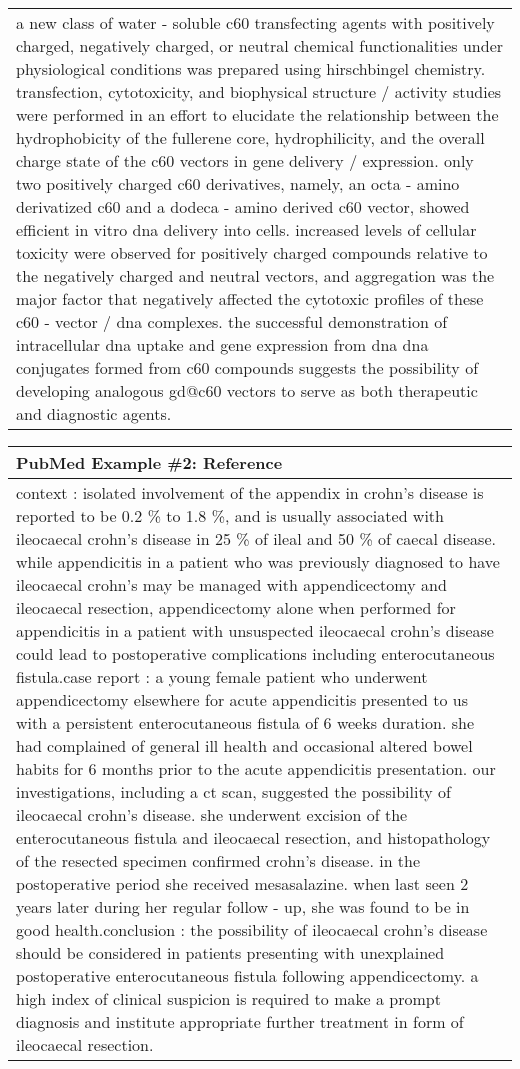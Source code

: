 \documentclass{article} \usepackage{iclr2022_conference,times}
\begin{document}
\begin{table}[!htbp]
\begin{tabular}{p{\linewidth}}
a new class of water - soluble c60 transfecting agents with positively charged, negatively charged, or neutral chemical functionalities under physiological conditions was prepared using hirschbingel chemistry. transfection, cytotoxicity, and biophysical structure / activity studies were performed in an effort to elucidate the relationship between the hydrophobicity of the fullerene core, hydrophilicity, and the overall charge state of the c60 vectors in gene delivery / expression. only two positively charged c60 derivatives, namely, an octa - amino derivatized c60 and a dodeca - amino derived c60 vector, showed efficient in vitro dna delivery into cells. increased levels of cellular toxicity were observed for positively charged compounds relative to the negatively charged and neutral vectors, and aggregation was the major factor that negatively affected the cytotoxic profiles of these c60 - vector / dna complexes. the successful demonstration of intracellular dna uptake and gene expression from dna dna conjugates formed from c60 compounds suggests the possibility of developing analogous gd@c60 vectors to serve as both therapeutic and diagnostic agents.
    \\
    \end{tabular}
    \begin{tabular}{p{\linewidth}} 
    \midrule
    \textbf{PubMed Example \#2: Reference} \\
    \midrule
context : isolated involvement of the appendix in crohn's disease is reported to be 0.2 \% to 1.8 \%, and is usually associated with ileocaecal crohn's disease in 25 \% of ileal and 50 \% of caecal disease. while appendicitis in a patient who was previously diagnosed to have ileocaecal crohn's may be managed with appendicectomy and ileocaecal resection, appendicectomy alone when performed for appendicitis in a patient with unsuspected ileocaecal crohn's disease could lead to postoperative complications including enterocutaneous fistula.case report : a young female patient who underwent appendicectomy elsewhere for acute appendicitis presented to us with a persistent enterocutaneous fistula of 6 weeks duration. she had complained of general ill health and occasional altered bowel habits for 6 months prior to the acute appendicitis presentation. our investigations, including a ct scan, suggested the possibility of ileocaecal crohn's disease. she underwent excision of the enterocutaneous fistula and ileocaecal resection, and histopathology of the resected specimen confirmed crohn's disease. in the postoperative period she received mesasalazine. when last seen 2 years later during her regular follow - up, she was found to be in good health.conclusion : the possibility of ileocaecal crohn's disease  should be considered in patients presenting with unexplained postoperative enterocutaneous fistula following appendicectomy. a high index of clinical suspicion is required to make a prompt diagnosis and institute appropriate further treatment in form of ileocaecal resection.

\end{tabular}
\end{table}
\end{document}
